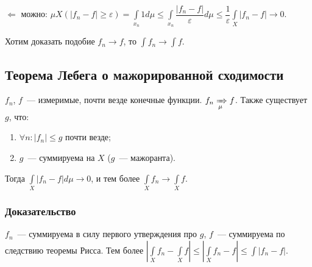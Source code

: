\documentclass{article}
\begin{document}
        $\Leftarrow$ можно: $\mu X ( |f_n - f| \geqslant \varepsilon) = \int\limits_{x_n} 1 d \mu \leqslant \int\limits_{x_n} \dfrac{|f_n - f|}{\varepsilon} d \mu \leqslant \dfrac{1}{\varepsilon} \int\limits_X |f_n - f| \rightarrow 0$.
        
        Хотим доказать подобие $f_n \rightarrow f$, то $\int f_n \rightarrow \int f$.
        
        \subsection{Теорема Лебега о мажорированной сходимости}
        
            $f_n$, $f$~--- измеримые, почти везде конечные функции. $f_n \xRightarrow[\mu]{} f$. Также существует $g$, что:
            
            \begin{enumerate}
            
                \item $\forall n : |f_n| \leqslant g$ почти везде;
                
                \item $g$~--- суммируема на $X$ ($g$~--- мажоранта).
                
            \end{enumerate}
        
            Тогда $\int\limits_X |f_n - f| d \mu \rightarrow 0$, и тем более $\int\limits_X f_n \rightarrow \int\limits_X f$.
            
            \subsubsection{Доказательство}
            
                $f_n$~--- суммируема в силу первого утверждения про $g$, $f$~--- суммируема по следствию теоремы Рисса. Тем более $\left| \int\limits_X f_n - \int\limits_X f \right| \leqslant \left| \int\limits_X f_n - f \right| \leqslant \int |f_n  - f|$.
                
\end{document}
